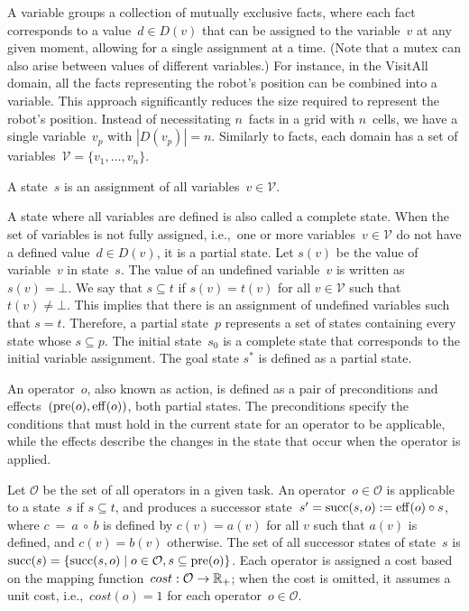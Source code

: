 A variable groups a collection of mutually exclusive facts, where each fact corresponds to a value~$d \in D(v)$ that can be assigned to the variable~$v$ at any given moment, allowing for a single assignment at a time. (Note that a mutex can also arise between values of different variables.) For instance, in the VisitAll domain, all the facts representing the robot's position can be combined into a variable. This approach significantly reduces the size required to represent the robot's position. Instead of necessitating $n$~facts in a grid with $n$~cells, we have a single variable~$v_p$ with $|D(v_p)| = n$. Similarly to facts, each domain has a set of variables~$\mathcal{V} = \{v_1,\ldots,v_n\}$.

\begin{definition}[State]
    \label{def:state}
    A state~$s$ is an assignment of all variables~$v \in \mathcal{V}$.
\end{definition}

A state where all variables are defined is also called a complete state. When the set of variables is not fully assigned, i.e.,~one or more variables~$v \in \mathcal{V}$ do not have a defined value~$d \in D(v)$, it is a partial state. Let $s(v)$ be the value of variable~$v$ in state~$s$. The value of an undefined variable~$v$ is written as~$s(v) = \bot$. We say that $s \subseteq t$ if $s(v) = t(v)$ for all $v \in \mathcal{V}$ such that $t(v) \neq \bot$. This implies that there is an assignment of undefined variables such that $s = t$. Therefore, a partial state~$p$ represents a set of states containing every state whose $s \subseteq p$. The initial state~$s_0$ is a complete state that corresponds to the initial variable assignment. The goal state $s^*$ is defined as a partial state.

\begin{definition}[Operator]
    \label{def:operator}
    An operator~$o$, also known as action, is defined as a pair of preconditions and effects~$(\operatorname{pre}(o),\operatorname{eff}(o))$, both partial states. The preconditions specify the conditions that must hold in the current state for an operator to be applicable, while the effects describe the changes in the state that occur when the operator is applied.
\end{definition}

Let $\mathcal{O}$ be the set of all operators in a given task. An operator~$o \in \mathcal{O}$ is applicable to a state~$s$ if $s \subseteq t$, and produces a successor state~$s' = \operatorname{succ}(s,o) := \operatorname{eff}(o) \circ s$, where $c~=~a~\circ~b$ is defined by $c(v) = a(v)$ for all $v$ such that $a(v)$ is defined, and $c(v)=b(v)$ otherwise. The set of all successor states of state~$s$ is $\operatorname{succ}(s) = \{\operatorname{succ}(s,o) \mid o \in \mathcal{O}, s \subseteq \operatorname{pre}(o)\}$. Each operator is assigned a cost based on the mapping function~$cost:\mathcal{O}\rightarrow\mathbb{R}_{+}$; when the cost is omitted, it assumes a unit cost, i.e.,~$cost(o) = 1$ for each operator~$o \in \mathcal{O}$.

